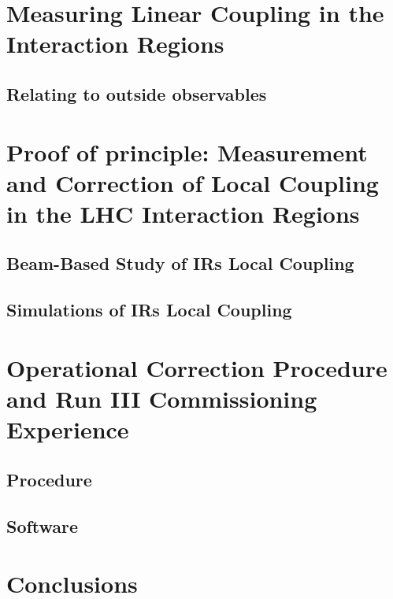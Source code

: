 \section{Measuring Linear Coupling in the Interaction Regions}

\subsection{Relating to outside observables}


\section{Proof of principle: Measurement and Correction of Local Coupling in the LHC Interaction Regions}

\subsection{Beam-Based Study of IRs Local Coupling}

\subsection{Simulations of IRs Local Coupling}


\section{Operational Correction Procedure and Run III Commissioning Experience}

\subsection{Procedure}

\subsection{Software}


\section{Conclusions}

